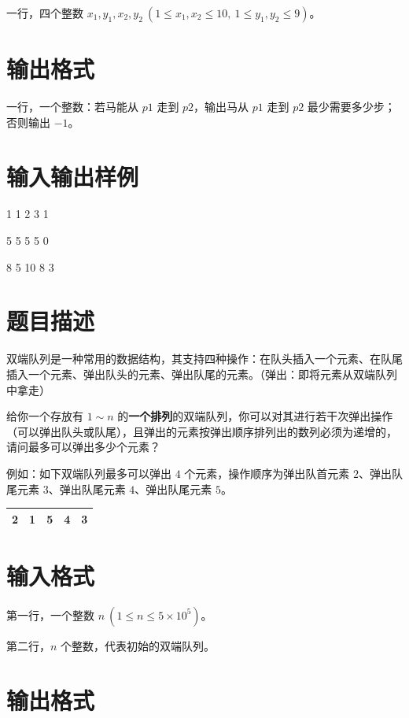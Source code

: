 \documentclass{../cpct/ctpro}
\begin{document}
一行，四个整数 $x_1,y_1,x_2,y_2~(1 \leq x_1,x_2 \leq 10,~1 \leq y_1,y_2 \leq 9)$。

\section*{输出格式}

一行，一个整数：若马能从 $p1$ 走到 $p2$，输出马从 $p1$ 走到 $p2$ 最少需要多少步；否则输出 $-1$。

\section*{输入输出样例}

\testcasetab
{
    1 1 2 3
}
{
    1
}

\testcasetab
{
    5 5 5 5
}
{
    0
}

\testcasetab
{
    8 5 10 8
}
{
    3
}

\makeproblem
\section*{题目描述}

双端队列是一种常用的数据结构，其支持四种操作：在队头插入一个元素、在队尾插入一个元素、弹出队头的元素、弹出队尾的元素。（弹出：即将元素从双端队列中拿走）

给你一个存放有 $1 \sim n$ 的\textbf{一个排列}的双端队列，你可以对其进行若干次弹出操作（可以弹出队头或队尾），且弹出的元素按弹出顺序排列出的数列必须为递增的，请问最多可以弹出多少个元素？

例如：如下双端队列最多可以弹出 $4$ 个元素，操作顺序为弹出队首元素 $2$、弹出队尾元素 $3$、弹出队尾元素 $4$、弹出队尾元素 $5$。

\begin{center}
    \begin{tabularx}{200pt}{M|M|M|M|M}
         & 1 & 5 & 4 & 3 \\
        \bottomrule
    \end{tabularx}
\end{center}

\section*{输入格式}

第一行，一个整数 $n~(1 \leq n \leq 5 \times {10}^5)$。

第二行，$n$ 个整数，代表初始的双端队列。

\section*{输出格式}
\end{document}

